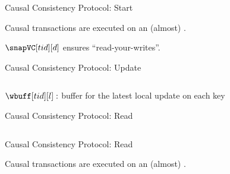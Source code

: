 \begin{frame}{Causal Consistency Protocol: Start}
  \begin{center}
    Causal transactions are executed on an (almost) .

    \vspace{0.20cm}
    \vspace{0.20cm}

    $\snapVC[tid][d]$ ensures ``{read-your-writes}''.
  \end{center}
\end{frame}

\begin{frame}{Causal Consistency Protocol: Update}
  \begin{center}
    \begin{columns}
    \end{columns}

    \vspace{0.80cm}
    $\wbuff[tid][l]:$ buffer for the latest local update on each key
  \end{center}
\end{frame}

\begin{frame}{Causal Consistency Protocol: Read}
  \begin{center}
    \begin{columns}
    \end{columns}
  \end{center}
\end{frame}

\begin{frame}{Causal Consistency Protocol: Read}
  \begin{center}
    Causal transactions are executed on an (almost) .

  \end{center}
\end{frame}

